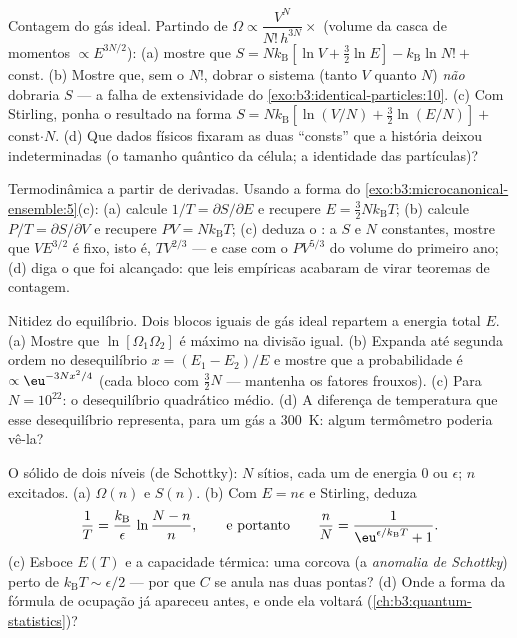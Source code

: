 \begin{exercise}[$\star\star$]\label{exo:b3:microcanonical-ensemble:5}
Contagem do gás ideal. Partindo de
$\Omega \propto \dfrac{V^N}{N!\,h^{3N}}\times$ (volume da casca de
momentos $\propto E^{3N/2}$): (a) mostre que $S = Nk_{\text{B}}[\ln V +
\tfrac32\ln E] - k_{\text{B}}\ln N! + $ const. (b) Mostre que, sem o
$N!$, dobrar o sistema (tanto $V$ quanto $N$) \emph{não} dobraria $S$
--- a falha de extensividade do
\cref{exo:b3:identical-particles:10}. (c) Com Stirling, ponha o
resultado na forma $S = Nk_{\text{B}}[\ln(V/N) + \tfrac32\ln(E/N)]
+ $ const$\cdot N$. (d) Que dados físicos fixaram as duas ``consts''
que a história deixou indeterminadas (o tamanho quântico da célula; a
identidade das partículas)?
\end{exercise}

\begin{exercise}[$\star\star$]\label{exo:b3:microcanonical-ensemble:6}
Termodinâmica a partir de derivadas. Usando a forma do
\cref{exo:b3:microcanonical-ensemble:5}(c): (a) calcule $1/T =
\partial S/\partial E$ e recupere $E = \tfrac32 Nk_{\text{B}}T$;
(b) calcule $P/T = \partial S/\partial V$ e recupere $PV =
Nk_{\text{B}}T$; (c) deduza o : a $S$ e $N$
constantes, mostre que $VE^{3/2}$ é fixo, isto é, $TV^{2/3}$ --- e case
com o $PV^{5/3}$ do volume do primeiro ano; (d) diga o que foi
alcançado: que leis empíricas acabaram de virar teoremas de contagem.
\end{exercise}

\begin{exercise}[$\star\star$]\label{exo:b3:microcanonical-ensemble:7}
Nitidez do equilíbrio. Dois blocos iguais de gás ideal repartem a
energia total $E$. (a) Mostre que $\ln[\Omega_1\Omega_2]$ é máximo na
divisão igual. (b) Expanda até segunda ordem no desequilíbrio $x =
(E_1 - E_2)/E$ e mostre que a probabilidade é
$\propto\eu^{-3Nx^2/4}$ (cada bloco com $\tfrac32 N$  --- mantenha os fatores frouxos). (c) Para $N = 10^{22}$: o
desequilíbrio quadrático médio. (d) A diferença de temperatura que esse
desequilíbrio representa, para um gás a \qty{300}{K}: algum termômetro
poderia vê-la?
\end{exercise}

\begin{exercise}[$\star\star$]\label{exo:b3:microcanonical-ensemble:8}
O sólido de dois níveis (de Schottky): $N$ sítios, cada um de energia
$0$ ou $\epsilon$; $n$ excitados. (a) $\Omega(n)$ e $S(n)$. (b) Com $E =
n\epsilon$ e Stirling, deduza
\[
\frac1T = \frac{k_{\text{B}}}{\epsilon}\,
\ln\frac{N - n}{n} ,
\qquad\text{e portanto}\qquad
\frac nN = \frac{1}{\eu^{\epsilon/k_{\text{B}}T} + 1} .
\]
(c) Esboce $E(T)$ e a capacidade térmica: uma corcova (a \emph{anomalia
de Schottky}) perto de $k_{\text{B}}T \sim \epsilon/2$ --- por que $C$
se anula nas duas pontas? (d) Onde a forma da fórmula de ocupação já
apareceu antes, e onde ela voltará
(\cref{ch:b3:quantum-statistics})?
\end{exercise}

